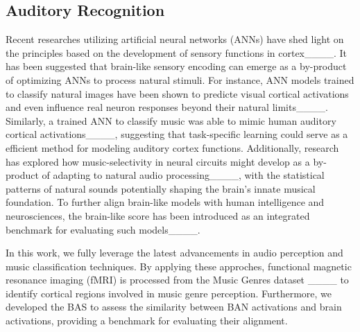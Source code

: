 \par


\subsection{Auditory Recognition}

Recent researches utilizing artificial neural networks (ANNs) have shed light on the principles based on the development of sensory functions in cortex____. 
It has been suggested that brain-like sensory encoding can emerge as a by-product of optimizing ANNs to process natural stimuli.
For instance, ANN models trained to classify natural images have been shown to predicte visual cortical activations and even influence real neuron responses beyond their natural limits____. 
Similarly, a trained ANN to classify music was able to mimic human auditory cortical activations____, suggesting that task-specific learning could serve as a efficient method for modeling auditory cortex functions. 
Additionally, research has explored how music-selectivity in neural circuits might develop as a by-product of adapting to natural audio processing____, with the statistical patterns of natural sounds potentially shaping the brain’s innate musical foundation. 
To further align brain-like models with human intelligence and neurosciences, the brain-like score has been introduced as an integrated benchmark for evaluating such models____.


In this work, we fully leverage the latest advancements in audio perception and music classification techniques. 
By applying these approches,  functional magnetic resonance imaging (fMRI) is processed from the Music Genres dataset ____ to identify cortical regions involved in music genre perception. 
Furthermore, we developed the BAS to assess the similarity between BAN activations and brain activations, providing a benchmark for evaluating their alignment.



